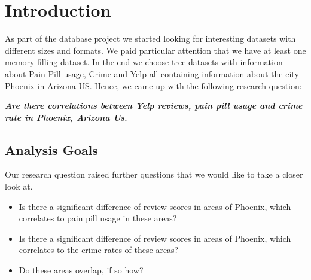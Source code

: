 \section{Introduction}
As part of the database project we started looking for interesting datasets with different sizes and formats. We paid particular attention that we have at least one memory filling dataset. In the end we choose tree datasets with information about Pain Pill usage, Crime and Yelp all containing information about the city Phoenix in Arizona US. Hence, we came up with the following research question:\\
\begin{center}
\textbf{\emph{Are there correlations between Yelp reviews, pain pill usage and crime rate in Phoenix, Arizona Us.}}
\end{center}
\subsection*{Analysis Goals}
Our research question raised further questions that we would like to take a closer look at.
\begin{itemize}
    \item Is there a significant difference of review scores in areas of Phoenix, which correlates to pain pill usage in these areas?
    \item Is there a significant difference of review scores in areas of Phoenix, which correlates to the crime rates of these areas?
    \item Do these areas overlap, if so how?
\end{itemize}






